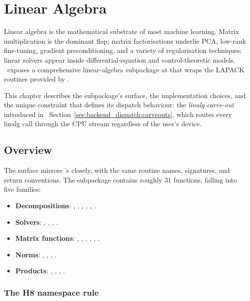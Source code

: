 \chapter{Linear Algebra}
\label{ch:linalg}

Linear algebra is the mathematical substrate of most machine
learning. Matrix multiplication is the dominant flop; matrix
factorisations underlie PCA, low-rank fine-tuning, gradient
preconditioning, and a variety of regularisation techniques;
linear solvers appear inside differential-equation and
control-theoretic models. \Lucid\ exposes a comprehensive
linear-algebra subpackage at  that wraps the
LAPACK routines provided by \Accelerate.

This chapter describes the subpackage's surface, the
implementation choices, and the unique constraint that defines
its dispatch behaviour: the \emph{linalg carve-out} introduced in
~Section~\ref{sec:backend_dispatch:carveouts},
which routes every linalg call through the CPU stream regardless
of the user's device.

\section{Overview}
\label{sec:linalg:overview}

The  surface mirrors 's
 closely, with the same routine names,
signatures, and return conventions. The subpackage contains
roughly 31 functions, falling into five families:

\begin{itemize}
  \item \textbf{Decompositions}: , ,
    , , , .
  \item \textbf{Solvers}: , ,
    , .
  \item \textbf{Matrix functions}: , ,
    , , ,
    .
  \item \textbf{Norms}: , ,
    , .
  \item \textbf{Products}: , ,
    , .
\end{itemize}

\subsection{The H8 namespace rule}
\label{ssec:linalg:h8_rule}

